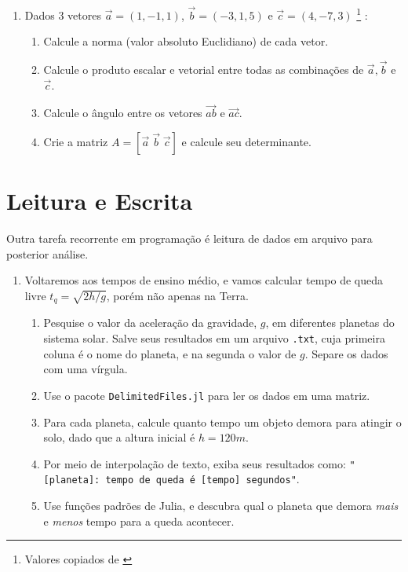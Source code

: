 \documentclass[
  letterpaper,
  DIV=11,
  numbers=noendperiod]{scrreprt}
\begin{document}
\begin{enumerate}
\def\labelenumi{\arabic{enumi}.}
\item
  Dados 3 vetores \(\vec{a} = (1,-1,1)\), \(\vec{b} = (-3,1,5)\) e
  \(\vec{c} = (4,-7,3)\) \footnote{Valores copiados de \cite{p1_ex2}} :

  \begin{enumerate}
  \def\labelenumii{\alph{enumii}.}
  \item
    Calcule a norma (valor absoluto Euclidiano) de cada vetor.
  \item
    Calcule o produto escalar e vetorial entre todas as combinações de
    \(\vec{a},\vec{b}\) e \(\vec{c}\).
  \item
    Calcule o ângulo entre os vetores \(\vec{ab}\) e \(\vec{ac}\).
  \item
    Crie a matriz \(A = [\vec{a}\; \vec{b}\; \vec{c}]\) e calcule seu
    determinante.
  \end{enumerate}
\end{enumerate}

\hypertarget{leitura-e-escrita}{%
\section{Leitura e Escrita}\label{leitura-e-escrita}}

Outra tarefa recorrente em programação é leitura de dados em arquivo
para posterior análise.

\begin{enumerate}
\def\labelenumi{\arabic{enumi}.}
\setcounter{enumi}{1}
\item
  Voltaremos aos tempos de ensino médio, e vamos calcular tempo de queda
  livre \(t_q = \sqrt{2h/g}\), porém não apenas na Terra.

  \begin{enumerate}
  \def\labelenumii{\alph{enumii}.}
  \item
    Pesquise o valor da aceleração da gravidade, \(g\), em diferentes
    planetas do sistema solar. Salve seus resultados em um arquivo
    \texttt{.txt}, cuja primeira coluna é o nome do planeta, e na
    segunda o valor de \(g\). Separe os dados com uma vírgula.
  \item
    Use o pacote \texttt{DelimitedFiles.jl} para ler os dados em uma
    matriz.
  \item
    Para cada planeta, calcule quanto tempo um objeto demora para
    atingir o solo, dado que a altura inicial é \(h=120 m\).
  \item
    Por meio de interpolação de texto, exiba seus resultados como:
    \texttt{"{[}planeta{]}:\ tempo\ de\ queda\ é\ {[}tempo{]}\ segundos"}.
  \item
    Use funções padrões de Julia, e descubra qual o planeta que demora
    \emph{mais} e \emph{menos} tempo para a queda acontecer.
  \end{enumerate}
\end{enumerate}
\end{document}

